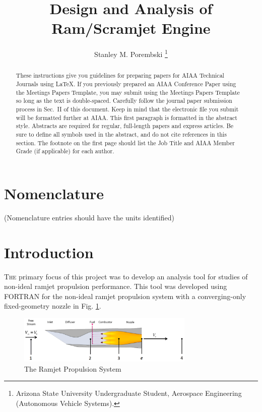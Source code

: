 \documentclass[conf]{new-aiaa} %
\title{Design and Analysis of Ram/Scramjet Engine}
\author{Stanley M. Porembski \footnote{Arizona State University Undergraduate Student, Aerospace Engineering (Autonomous Vehicle Systems).}}
\affil{Arizona State University Ira A. Schools of Engineering, Tempe, AZ, 85281}
\begin{document}
\maketitle

\begin{abstract}
These instructions give you guidelines for preparing papers for AIAA Technical Journals using \LaTeX{}. If you previously prepared an AIAA Conference Paper using the Meetings Papers Template, you may submit using the Meetings Papers Template so long as the text is double-spaced.  Carefully follow the journal paper submission process in Sec.~II of this document. Keep in mind that the electronic file you submit will be formatted further at AIAA. This first paragraph is formatted in the abstract style. Abstracts are required for regular, full-length papers and express articles. Be sure to define all symbols used in the abstract, and do not cite references in this section. The footnote on the first page should list the Job Title and AIAA Member Grade (if applicable) for each author.
\end{abstract}


\section*{Nomenclature}

\noindent(Nomenclature entries should have the units identified)




\section{Introduction}
\lettrine{T}{he} primary focus of this project was to develop an analysis tool for studies of non-ideal ramjet propulsion performance. This tool was developed using FORTRAN for the non-ideal ramjet propulsion system with a converging-only fixed-geometry nozzle in Fig. \ref{fig:propsys}.

\begin{figure}[hbt!] %
    \centering
    \includegraphics[width=0.75\textwidth]{media/the_ramjet.png}
    \caption{\label{fig:propsys} The Ramjet Propulsion System}
\end{figure}
\end{document}
